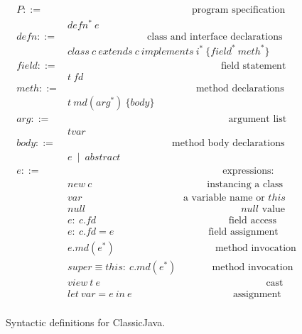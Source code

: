 \documentclass[tese,capa,english]{texufpel}
\begin{document}
\begin{figure}[!htb]
\[
\begin{array}{ll}
  P ::= & \hspace{150pt} \textrm{program specification} \\
        & defn^{*} \ e \\
  defn ::= & \hspace{96pt} \textrm{class and interface declarations} \\
        & class \ c \ extends \ c \ implements \ i^{*} \ \{ field^{*} \ meth^{*} \} \\
  field ::= & \hspace{185pt} \textrm{field statement} \\
        & t \ fd \\
  meth ::= & \hspace{155pt} \textrm{method declarations} \\
        & t \ md ( arg^{*} ) \ \{ body \} \\
  arg ::= & \hspace{194pt} \textrm{argument list} \\
        & t var \\
  body ::= & \hspace{126pt} \textrm{method body declarations} \\
        & e \ \mid \ abstract \\
  e ::= & \hspace{187pt} \textrm{expressions: } \\
        & new \ c \hspace{139pt} \textrm{instancing a class} \\
        & var \hspace{122pt} \textrm{a variable name or $this$} \\
        & null \hspace{188pt} \textrm{$null$ value} \\
        & e: \ c.fd \hspace{160pt} \textrm{field access} \\
        & e: \ c.fd = e \hspace{114pt} \textrm{field assignment} \\
        & e.md(e^{*}) \hspace{121pt} \textrm{method invocation} \\
        & super \equiv this: \ c.md(e^{*}) \hspace{43pt} \textrm{method invocation} \\
        & view \ t \ e \hspace{200pt} \textrm{cast} \\
        & let \ var = e \ in \ e \hspace{122pt} \textrm{assignment} \\
\end{array}
\]
\vspace{-2ex}
\caption{Syntactic definitions for ClassicJava.}
\label{fig:cj-syntax}
\end{figure}
\end{document}

